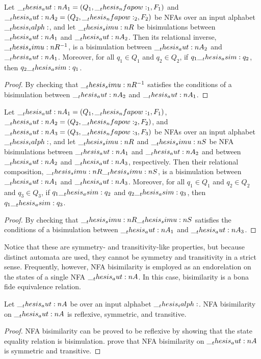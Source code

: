 \begin{theorem}\label{thm:nfa-bisim-sym}
  Let $\__thesis_aut:n {A}_1 = (Q_1, \__thesis_nfapow:_1, F_1)$ and $\__thesis_aut:n {A}_2 = (Q_2, \__thesis_nfapow:_2, F_2)$ be \acp{NFA} over an input alphabet $\__thesis_ialph:$, and let $\__thesis_simu:n {R}$ be  bisimulations between $\__thesis_aut:n {A}_1$ and $\__thesis_aut:n {A}_2$.
  Then its relational inverse, $\__thesis_simu:n {R}^{-1}$, is a bisimulation between $\__thesis_aut:n {A}_2$ and $\__thesis_aut:n {A}_1$.
  Moreover, for all $q_1 \in Q_1$ and $q_2 \in Q_2$, if $q_1 \__thesis_asim: q_2$, then $q_2 \__thesis_asim: q_1$.
\end{theorem}
\begin{proof}
  By checking that $\__thesis_simu:n {R}^{-1}$ satisfies the conditions of a bisimulation between $\__thesis_aut:n {A}_2$ and $\__thesis_aut:n {A}_1$.
\end{proof}

\begin{theorem}\label{thm:nfa-bisim-trans}
  Let $\__thesis_aut:n {A}_1 = (Q_1, \__thesis_nfapow:_1, F_1)$, $\__thesis_aut:n {A}_2 = (Q_2, \__thesis_nfapow:_2, F_2)$, and $\__thesis_aut:n {A}_3 = (Q_3, \__thesis_nfapow:_3, F_3)$ be \acp{NFA} over an input alphabet $\__thesis_ialph:$, and let $\__thesis_simu:n {R}$ and $\__thesis_simu:n {S}$ be \ac{NFA} bisimulations between $\__thesis_aut:n {A}_1$ and $\__thesis_aut:n {A}_2$ and between $\__thesis_aut:n {A}_2$ and $\__thesis_aut:n {A}_3$, respectively.
  Then their relational composition, $\__thesis_simu:n {R}\__thesis_simu:n {S}$, is a bisimulation between $\__thesis_aut:n {A}_1$ and $\__thesis_aut:n {A}_3$.
  Moreover, for all $q_1 \in Q_1$ and $q_2 \in Q_2$ and $q_3 \in Q_3$, if $q_1 \__thesis_asim: q_2$ and $q_2 \__thesis_asim: q_3$, then $q_1 \__thesis_asim: q_3$.
\end{theorem}
\begin{proof}
  By checking that $\__thesis_simu:n {R}\__thesis_simu:n {S}$ satisfies the conditions of a bisimulation between $\__thesis_aut:n {A}_1$ and $\__thesis_aut:n {A}_3$.
\end{proof}

Notice that these  are symmetry- and transitivity-like properties, but because distinct automata are used, they cannot be symmetry and transitivity in a strict sense.
Frequently, however, \ac{NFA} bisimilarity is employed as an endorelation on the states of a single \ac{NFA} $\__thesis_aut:n {A}$.
In this case, bisimilarity is a bona fide equivalence relation.%
%
\begin{theorem}
  Let $\__thesis_aut:n {A}$ be  over an input alphabet $\__thesis_ialph:$.
  \Ac{NFA} bisimilarity on $\__thesis_aut:n {A}$ is reflexive, symmetric, and transitive.
\end{theorem}
%
\begin{proof}
  \Ac{NFA} bisimilarity can be proved to be reflexive by showing that the state equality relation is  bisimulation.
   prove that \ac{NFA} bisimilarity on $\__thesis_aut:n {A}$ is symmetric and transitive.
\end{proof}

